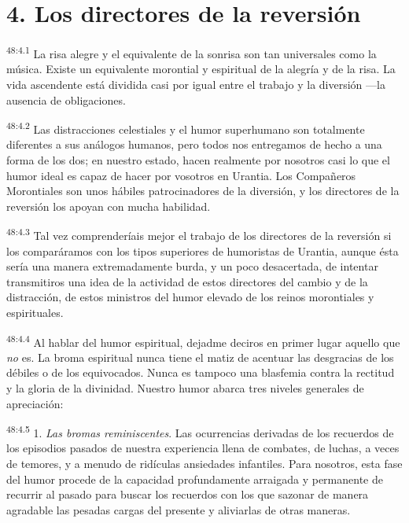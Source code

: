\section*{4. Los directores de la reversión}
\par
\textsuperscript{48:4.1} La risa alegre y el equivalente de la sonrisa son tan universales como la música. Existe un equivalente morontial y espiritual de la alegría y de la risa. La vida ascendente está dividida casi por igual entre el trabajo y la diversión ---la ausencia de obligaciones.

\par
\textsuperscript{48:4.2} Las distracciones celestiales y el humor superhumano son totalmente diferentes a sus análogos humanos, pero todos nos entregamos de hecho a una forma de los dos; en nuestro estado, hacen realmente por nosotros casi lo que el humor ideal es capaz de hacer por vosotros en Urantia. Los Compañeros Morontiales son unos hábiles patrocinadores de la diversión, y los directores de la reversión los apoyan con mucha habilidad.

\par
\textsuperscript{48:4.3} Tal vez comprenderíais mejor el trabajo de los directores de la reversión si los comparáramos con los tipos superiores de humoristas de Urantia, aunque ésta sería una manera extremadamente burda, y un poco desacertada, de intentar transmitiros una idea de la actividad de estos directores del cambio y de la distracción, de estos ministros del humor elevado de los reinos morontiales y espirituales.

\par
\textsuperscript{48:4.4} Al hablar del humor espiritual, dejadme deciros en primer lugar aquello que \textit{no} es. La broma espiritual nunca tiene el matiz de acentuar las desgracias de los débiles o de los equivocados. Nunca es tampoco una blasfemia contra la rectitud y la gloria de la divinidad. Nuestro humor abarca tres niveles generales de apreciación:

\par
\textsuperscript{48:4.5} 1. \textit{Las bromas reminiscentes}. Las ocurrencias derivadas de los recuerdos de los episodios pasados de nuestra experiencia llena de combates, de luchas, a veces de temores, y a menudo de ridículas ansiedades infantiles. Para nosotros, esta fase del humor procede de la capacidad profundamente arraigada y permanente de recurrir al pasado para buscar los recuerdos con los que sazonar de manera agradable las pesadas cargas del presente y aliviarlas de otras maneras.

